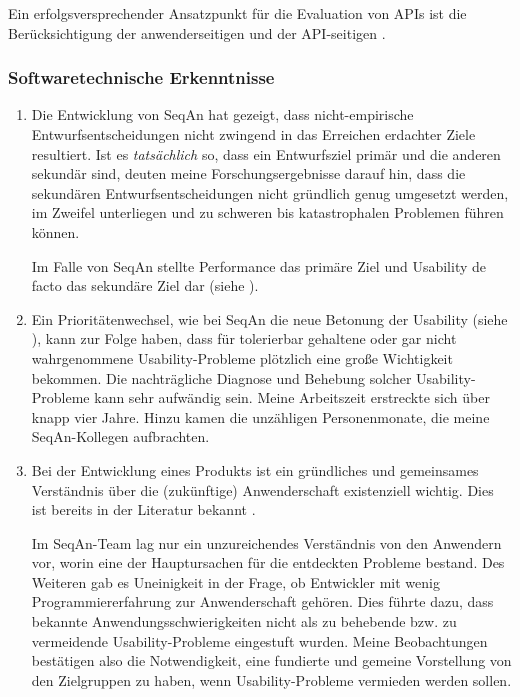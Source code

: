 Ein erfolgsversprechender Ansatzpunkt für die Evaluation von APIs ist die Berücksichtigung der anwenderseitigen  und der API-seitigen .


\subsubsection{Softwaretechnische Erkenntnisse}   
\begin{enumerate}
  \item Die Entwicklung von SeqAn hat gezeigt, dass nicht-empirische Entwurfsentscheidungen nicht zwingend in das Erreichen erdachter Ziele resultiert. Ist es \textit{tatsächlich} so, dass ein Entwurfsziel primär und die anderen sekundär sind, deuten meine Forschungsergebnisse darauf hin, dass die sekundären Entwurfsentscheidungen nicht gründlich genug umgesetzt werden, im Zweifel unterliegen und zu schweren bis katastrophalen Problemen führen können.
  
  Im Falle von SeqAn stellte Performance das primäre Ziel und Usability de facto das sekundäre Ziel dar (siehe ).
  
  \item Ein Prioritätenwechsel, wie bei SeqAn die neue Betonung der Usability (siehe ), kann zur Folge haben, dass für tolerierbar gehaltene oder gar nicht wahrgenommene Usability-Probleme plötzlich eine große Wichtigkeit bekommen. Die nachträgliche Diagnose und Behebung solcher Usability-Probleme kann sehr aufwändig sein. Meine Arbeitszeit erstreckte sich über knapp vier Jahre. Hinzu kamen die unzähligen Personenmonate, die meine SeqAn-Kollegen aufbrachten. %

  \item Bei der Entwicklung eines Produkts ist ein gründliches und gemeinsames Verständnis über die (zukünftige) Anwenderschaft existenziell wichtig. Dies ist bereits in der Literatur bekannt \citep[u.a.][]{Clarke:2004te,Henning:2007kg}.
  
  Im SeqAn-Team lag nur ein unzureichendes Verständnis von den Anwendern vor, worin eine der Hauptursachen für die entdeckten Probleme bestand. Des Weiteren gab es Uneinigkeit in der Frage, ob Entwickler mit wenig Programmiererfahrung zur Anwenderschaft gehören. Dies führte dazu, dass bekannte Anwendungsschwierigkeiten nicht als zu behebende bzw. zu vermeidende Usability-Probleme eingestuft wurden. Meine Beobachtungen bestätigen also die Notwendigkeit, eine fundierte und gemeine Vorstellung von den Zielgruppen zu haben, wenn Usability-Probleme vermieden werden sollen.
\end{enumerate}


